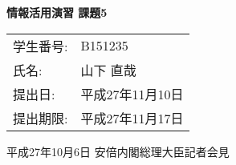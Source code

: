 \topmargin=-1.5cm
\textwidth=17cm
\textheight=25cm
\oddsidemargin=-0.5cm
\evensidemargin=-0.5cm


\begin{center}
  \Large\bf 情報活用演習 課題5
\end{center}

\begin{flushright}
  \begin{tabular}{ll}
    学生番号: & B151235 \\
    氏名:     & 山下 直哉 \\
    提出日:   & 平成27年11月10日 \\
    提出期限: & 平成27年11月17日 \\
  \end{tabular}
\end{flushright}

\begin{center}
  平成27年10月6日 安倍内閣総理大臣記者会見 \\
\end{center}

